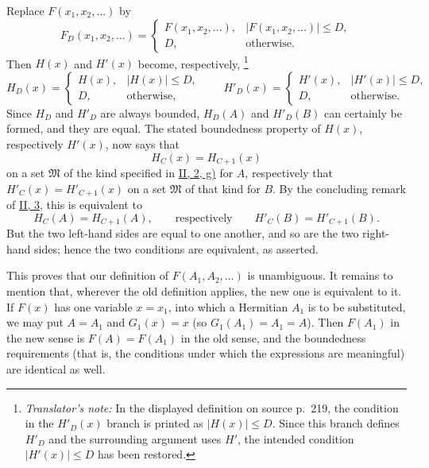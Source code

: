 \documentclass[12pt,b5paper,twoside]{article}
\newcommand{\translatorfootnote}[2]{%
  \begingroup
  \renewcommand{\thefootnote}{#1}%
  \footnote{\hspace{0.8em}\textit{Translator's note:} #2}%
  \endgroup}
\begin{document}
Replace $F(x_1,x_2,\ldots)$ by
\[
 F_D(x_1,x_2,\ldots)=
 \begin{cases}
   F(x_1,x_2,\ldots), & |F(x_1,x_2,\ldots)|\leq D,\\
   D, & \text{otherwise}.
 \end{cases}
\]
Then $H(x)$ and $H'(x)$ become, respectively,\translatorfootnote{T13}{In the displayed
definition on source p.~219, the condition in the $H'_D(x)$ branch is printed as
$|H(x)|\leq D$.  Since this branch defines $H'_D$ and the surrounding argument uses
$H'$, the intended condition $|H'(x)|\leq D$ has been restored.}
\[
 H_D(x)=
 \begin{cases}
   H(x), & |H(x)|\leq D,\\
   D, & \text{otherwise},
 \end{cases}
 \qquad
 H'_D(x)=
 \begin{cases}
   H'(x), & |H'(x)|\leq D,\\
   D, & \text{otherwise}.
 \end{cases}
\]
Since $H_D$ and $H'_D$ are always bounded, $H_D(A)$ and $H'_D(B)$ can certainly be
formed, and they are equal.  The stated boundedness property of $H(x)$, respectively
$H'(x)$, now says that
\[
 H_C(x)=H_{C+1}(x)
\]
on a set $\mathfrak{M}$ of the kind specified in \hyperref[sec:II.2]{II, 2, g)} for
$A$, respectively that $H'_C(x)=H'_{C+1}(x)$
on a set $\mathfrak{M}$ of that kind for $B$.  By the concluding remark of
\hyperref[sec:II.3]{II, 3}, this is equivalent to
\[
 H_C(A)=H_{C+1}(A),
 \qquad\text{respectively}\qquad
 H'_C(B)=H'_{C+1}(B).
\]
But the two left-hand sides are equal to one another, and so are the two right-hand
sides; hence the two conditions are equivalent, as asserted.

This proves that our definition of $F(A_1,A_2,\ldots)$ is unambiguous.  It remains to
mention that, wherever the old definition applies, the new one is equivalent to it.
If $F(x)$ has one variable $x=x_1$, into which a Hermitian $A_1$ is to be substituted,
we may put $A=A_1$ and $G_1(x)=x$ (so $G_1(A_1)=A_1=A$).  Then $F(A_1)$ in the new
sense is $F(A)=F(A_1)$ in the old sense, and the boundedness requirements (that is,
the conditions under which the expressions are meaningful) are identical as well.
\end{document}
